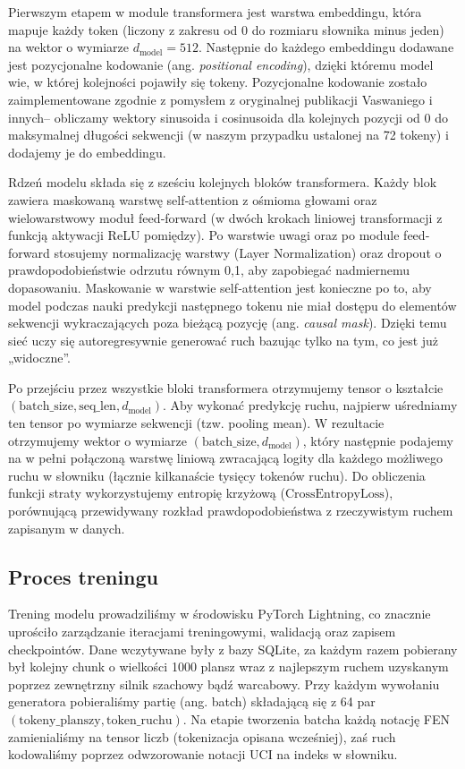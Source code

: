 \documentclass[12pt]{article}
\begin{document}
Pierwszym etapem w module transformera jest warstwa embeddingu, która mapuje każdy token (liczony z zakresu od 0 do rozmiaru słownika minus jeden) na wektor o wymiarze \(d_{\text{model}} = 512\). Następnie do każdego embeddingu dodawane jest pozycjonalne kodowanie (ang. \emph{positional encoding}), dzięki któremu model wie, w której kolejności pojawiły się tokeny. Pozycjonalne kodowanie zostało zaimplementowane zgodnie z pomysłem z oryginalnej publikacji Vaswaniego i innych\;– obliczamy wektory sinusoida i cosinusoida dla kolejnych pozycji od 0 do maksymalnej długości sekwencji (w naszym przypadku ustalonej na 72 tokeny) i dodajemy je do embeddingu.

Rdzeń modelu składa się z sześciu kolejnych bloków transformera. Każdy blok zawiera maskowaną warstwę self‐attention z ośmioma głowami oraz wielowarstwowy moduł feed‐forward (w dwóch krokach liniowej transformacji z funkcją aktywacji ReLU pomiędzy). Po warstwie uwagi oraz po module feed‐forward stosujemy normalizację warstwy (Layer Normalization) oraz dropout o prawdopodobieństwie odrzutu równym 0,1, aby zapobiegać nadmiernemu dopasowaniu. Maskowanie w warstwie self‐attention jest konieczne po to, aby model podczas nauki predykcji następnego tokenu nie miał dostępu do elementów sekwencji wykraczających poza bieżącą pozycję (ang. \emph{causal mask}). Dzięki temu sieć uczy się autoregresywnie generować ruch bazując tylko na tym, co jest już „widoczne”.

Po przejściu przez wszystkie bloki transformera otrzymujemy tensor o kształcie\\ \((\text{batch\_size}, \text{seq\_len}, d_{\text{model}})\). Aby wykonać predykcję ruchu, najpierw uśredniamy ten tensor po wymiarze sekwencji (tzw. pooling mean). W rezultacie otrzymujemy wektor o wymiarze \((\text{batch\_size}, d_{\text{model}})\), który następnie podajemy na w pełni połączoną warstwę liniową zwracającą logity dla każdego możliwego ruchu w słowniku (łącznie kilkanaście tysięcy tokenów ruchu). Do obliczenia funkcji straty wykorzystujemy entropię krzyżową (\(\text{CrossEntropyLoss}\)), porównującą przewidywany rozkład prawdopodobieństwa z rzeczywistym ruchem zapisanym w danych.

\subsection{Proces treningu}

Trening modelu prowadziliśmy w środowisku PyTorch Lightning, co znacznie uprościło zarządzanie iteracjami treningowymi, walidacją oraz zapisem checkpointów. Dane wczytywane były z bazy SQLite, za każdym razem pobierany był kolejny chunk o wielkości 1000 plansz wraz z najlepszym ruchem uzyskanym poprzez zewnętrzny silnik szachowy bądź warcabowy.  Przy każdym wywołaniu generatora pobieraliśmy partię (ang. batch) składającą się z 64 par \((\text{tokeny\_planszy}, \text{token\_ruchu})\). Na etapie tworzenia batcha każdą notację FEN zamienialiśmy na tensor liczb (tokenizacja opisana wcześniej), zaś ruch kodowaliśmy poprzez odwzorowanie notacji UCI na indeks w słowniku.
\end{document}
